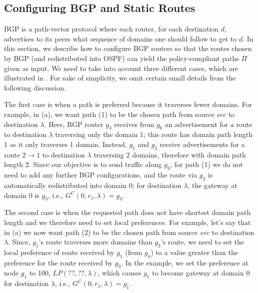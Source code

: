 \subsection{Configuring BGP and Static Routes}
BGP is a path-vector protocol where each router,
for each destination $d$,
advertises to its peers
what sequence of domains one should follow to get to  $d$.  
In this section, we describe how to configure
BGP routers so that the routes chosen by BGP (and redistributed into OSPF) 
can yield the policy-compliant
paths $\Pi$ given as input. 
We need to take into account three different
cases, which are illustrated in .  
For sake of simplicity, we omit certain small details from the following discussion.

The first case is when a path is preferred because it traverses fewer domains.
For example, in (a), we want
path (1) to be the chosen path from source $src$ to destination $\lambda$.
Here, BGP router $g_3$ receives from $g_6$ an advertisement for a route to destination $\lambda$
traversing only the domain $1$; this route has domain path length 1 as it only traverses 1 domain. 
Instead, $g_1$ and $g_2$ receive advertisements for a route $2 \rightarrow 1$
to destination $\lambda$ traversing 2 domains, therefore with 
domain path length 2. Since our objective is to send traffic along
$g_3$, for path (1) we do not need to add any further BGP configurations,
and the route via $g_3$ is automatically redistributed into domain 0;
for destination $\lambda$, the gateway at domain 0 is $g_3$, i.e.,
$G^C(0, r_1, \lambda) = g_3$.

The second case is when the requested path does not have shortest domain path length
and we therefore need to set local preferences.
For example, let's say that in (a) we now want
path (2) to be the chosen path from source $src$
to destination $\lambda$. 
Since, $g_1$'s route traverses more domains than
 $g_3$'s route,
we need to set the local preference of route received by $g_1$ 
(from $g_4$) to a value greater than the preference for the route received by $g_3$. 
In the example, we set the preference at node $g_1$ to 
100, $LP(??, ??, \lambda)$,
which causes $g_1$ to become gateway at domain 0 for destination $\lambda$, i.e., 
$G^C(0, r_1, \lambda) = g_1$.


